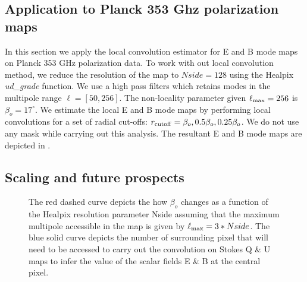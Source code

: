 \subsection{Application to Planck 353 Ghz polarization maps}
In this section we apply the local convolution estimator for E and B mode maps on Planck 353 GHz polarization data. To work with out local convolution method, we reduce the resolution of the map to $Nside=128$ using the Healpix \textit {ud\_grade} function. We use a high pass filters which retains modes in the multipole range $\ell=[50,256]$. The non-locality parameter given $\ell_{\rm max}=256$ is $\beta_o=17^{\circ}$. We estimate the local E and B mode maps by performing local convolutions for a set of radial cut-offs: $r_{\rm cutoff} = \beta_o, 0.5\beta_o, 0.25\beta_o$. We do not use any mask while carrying out this analysis. The resultant E and B mode maps are depicted in .
%
\begin{figure}[!h] 
\centering
{}
\caption{}
\label{fig:353ghz-eb-maps}
\end{figure}
%

\subsection{Scaling and future prospects}
%
\begin{figure}[!h] 
\centering
{}
\caption{The red dashed curve depicts the how $\beta_o$ changes as a function of the Healpix resolution parameter Nside assuming that the maximum multipole accessible in the map is given by $\ell_{\rm max} = 3 * Nside$. The blue solid curve depicts the number of surrounding pixel that will need to be accessed to carry out the convolution on Stokes Q \& U maps to infer the value of the scalar fields E \& B at the central pixel.}
\label{fig:disc_rad_healpix_numpix}
\end{figure}
%
